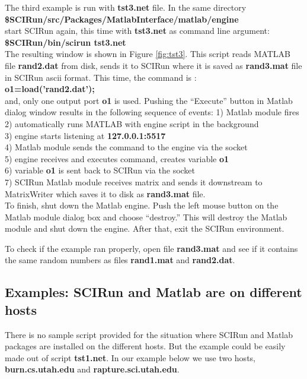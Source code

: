 \documentclass[12pt]{IEEEtran}
\newcommand{\sr}{SCIRun}
\begin{document}
The third example is run with {\bf tst3.net} file. In the same
directory \\
{\bf \$SCIRun/src/Packages/MatlabInterface/matlab/engine } \\
start SCIRun again, this time with {\bf tst3.net} as command line argument: \\
{\bf \$SCIRun/bin/scirun  tst3.net} \\
The resulting window is shown in Figure \ref{fig:tst3}. This
script reads MATLAB file {\bf rand2.dat} from disk, sends
it to \sr{} where it is saved as {\bf rand3.mat} file
in SCIRun ascii format. This time, the command is : \\
{\bf o1=load('rand2.dat');} \\
and, only one output port {\bf o1} is used. Pushing the
``Execute'' button in Matlab dialog window results in
the following sequence of events:
1) Matlab module fires \\
2) automatically runs MATLAB with engine script in the background  \\
3) engine starts listening at {\bf 127.0.0.1:5517} \\
4) Matlab module sends the command to the engine via the socket\\
5) engine receives and executes command, creates variable {\bf o1} \\
6) variable {\bf o1} is sent back to \sr{} via the socket \\
7) SCIRun Matlab module receives matrix and sends it downstream
   to MatrixWriter which saves it to disk as {\bf rand3.mat} file. \\

To finish, shut down the Matlab engine.
Push the left mouse button on the
Matlab module dialog box and choose ``destroy.'' This will destroy
the Matlab module and shut down the engine. After that, exit
the \sr{} environment.

To check if the example ran properly, open file {\bf rand3.mat}
and see if it contains the same random numbers as files {\bf rand1.mat}
and {\bf rand2.dat}.

\subsection*{Examples: SCIRun and Matlab are on different hosts} \indent

There is no sample script provided for the situation where SCIRun and
Matlab packages are installed on the different hosts. But the example
could be easily made out of script {\bf tst1.net}.  In our example
below we use two hosts, {\bf burn.cs.utah.edu} and {\bf rapture.sci.utah.edu}.
\end{document}
